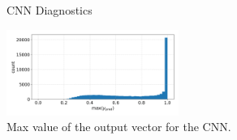 \begin{figure}[h]
    \centering
    \qquad
    \caption{CNN Diagnostics}
    \label{fig:cnn_qual}
\end{figure}

\begin{figure}[h]
    \centering
    \includegraphics[width=0.5\textwidth]{figures/cnn_max_ypred.png}
    \caption{Max value of the output vector for the CNN.}
    \label{fig:cnn_max}
\end{figure}


